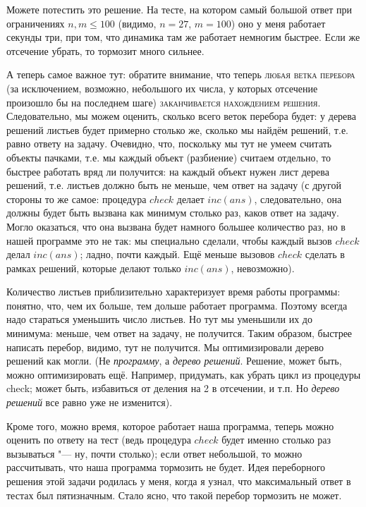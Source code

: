 Можете потестить это решение. На тесте, на котором самый большой ответ при ограничениях $n,m\leq 100$ (видимо, 
$n=27$, $m=100$) оно у меня работает секунды три, при том, что динамика 
там же работает немногим быстрее. Если же отсечение убрать, то тормозит много 
сильнее.

А теперь самое важное тут: обратите внимание, что теперь \textsc{любая ветка перебора} 
(за исключением, возможно, небольшого их числа, у которых отсечение произошло 
бы на последнем шаге) \textsc{заканчивается нахождением решения}. Следовательно, мы 
можем оценить, сколько всего веток перебора будет: у дерева решений листьев 
будет примерно столько же, сколько мы найдём решений, т.е. равно ответу на 
задачу. Очевидно, что, поскольку мы тут не умеем считать объекты пачками, т.е. мы 
каждый объект (разбиение) считаем отдельно, то быстрее работать вряд ли 
получится: на каждый объект нужен лист дерева решений, т.е. листьев должно быть 
не меньше, чем ответ на задачу (с другой стороны то же самое: процедура $check$ 
делает $inc(ans)$, следовательно, она должны будет быть вызвана как минимум 
столько раз, каков ответ на задачу. Могло оказаться, что она вызвана будет намного большее количество раз, но в нашей программе это не так: мы специально сделали, чтобы каждый вызов $check$ делал $inc(ans)$; ладно, почти каждый. Ещё меньше вызовов $check$ сделать в рамках решений, которые делают только $inc(ans)$, невозможно). 

Количество листьев приблизительно характеризует время работы программы: понятно,
что, чем их больше, тем дольше работает программа. Поэтому всегда надо стараться
уменьшить число листьев. Но тут мы уменьшили их до минимума: меньше, чем ответ
на задачу, не получится. Таким образом, быстрее написать перебор, видимо, тут 
не получится. Мы оптимизировали дерево решений как могли. (Не \textit{программу}, а \textit{дерево решений}. 
Решение, может быть, можно оптимизировать ещё. Например, придумать, как убрать цикл из 
процедуры check; может быть, избавиться от деления на 2 в отсечении, и т.п. Но \textit{дерево решений} все равно уже не изменится).


Кроме того, можно время, которое работает наша программа, теперь можно оценить по ответу на тест (ведь процедура $check$ будет именно столько раз вызываться "--- ну, почти столько); если ответ небольшой, то можно рассчитывать, что наша программа тормозить 
не будет. Идея переборного решения этой задачи родилась у меня, когда я узнал, что максимальный ответ в тестах был пятизначным. Стало ясно, что такой 
перебор тормозить не может.

